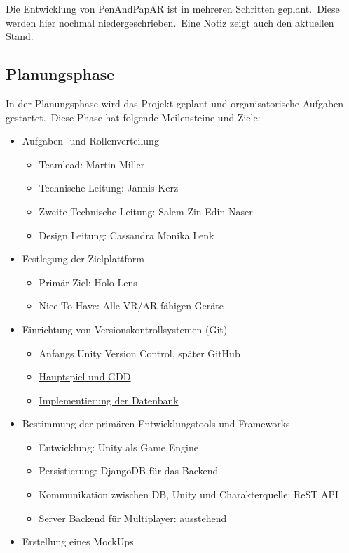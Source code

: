 Die Entwicklung von PenAndPapAR ist in mehreren Schritten geplant.\ Diese werden hier nochmal niedergeschrieben.\ Eine
Notiz zeigt auch den aktuellen Stand.

\subsection{Planungsphase}\label{subsec:planning}
In der Planungsphase wird das Projekt geplant und organisatorische Aufgaben gestartet.\ Diese Phase hat folgende
Meilensteine und Ziele:

\begin{itemize}
    \item Aufgaben- und Rollenverteilung
    \begin{itemize}
        \item Teamlead: Martin Miller
        \item Technische Leitung: Jannis Kerz
        \item Zweite Technische Leitung: Salem Zin Edin Naser
        \item Design Leitung: Cassandra Monika Lenk
    \end{itemize}
    \item Festlegung der Zielplattform
    \begin{itemize}
        \item Primär Ziel: Holo Lens
        \item Nice To Have: Alle VR/AR fähigen Geräte
    \end{itemize}
    \item Einrichtung von Versionskontrollsystemen (Git)
    \begin{itemize}
        \item Anfangs Unity Version Control, später GitHub
        \item \href{https://github.com/Sc1p1o/PenAndPapARGDD}{Hauptspiel und GDD}
        \item \href{https://github.com/Sc1p1o/PenAndPapARDB}{Implementierung der Datenbank}
    \end{itemize}
    \item Bestimmung der primären Entwicklungstools und Frameworks
    \begin{itemize}
        \item Entwicklung: Unity als Game Engine
        \item Persistierung: DjangoDB für das Backend
        \item Kommunikation zwischen DB, Unity und Charakterquelle: ReST API
        \item Server Backend für Multiplayer: ausstehend
    \end{itemize}
    \item Erstellung eines MockUps
\end{itemize}

